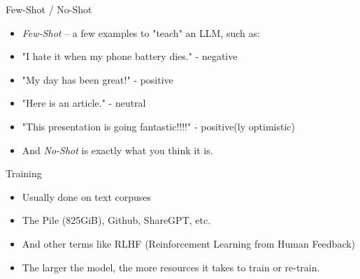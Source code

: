 \documentclass{beamer}
\begin{document}

\begin{frame}[plain]
\end{frame}

\begin{frame}{Few-Shot / No-Shot}
	\begin{itemize}
		\item \textit{Few-Shot} -- a few examples to "teach" an LLM, such as:
		\pause
		\item "I hate it when my phone battery dies." - negative
		\pause
		\item "My day has been great!" - positive
		\pause
		\item "Here is an article." - neutral
		\pause
		\item "This presentation is going fantastic!!!!" - positive(ly optimistic)
		\pause
		\item And \textit{No-Shot} is exactly what you think it is.
	\end{itemize}
\end{frame}

\begin{frame}{Training}
	\begin{itemize}
		\item Usually done on text corpuses
		\pause
		\item The Pile (825GiB), Github, ShareGPT, etc.
		\pause
		\item And other terms like RLHF (Reinforcement Learning from Human Feedback)
		\pause
		\item The larger the model, the more resources it takes to train or re-train.
	\end{itemize}
\end{frame}
\end{document}
